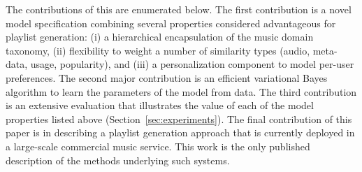 
The contributions of this are enumerated below. The first  contribution is a novel model specification combining several properties considered advantageous for playlist generation: (i) a hierarchical encapsulation of  the music domain taxonomy, (ii) flexibility to weight a number of similarity types (audio, meta-data, usage, popularity), and (iii) a personalization component to model per-user preferences. The second major contribution is an efficient  variational Bayes algorithm to learn the parameters of the model from data. The third contribution is an extensive evaluation that illustrates the value of each of the model properties listed above (Section~\ref{sec:experiments}). The final contribution of this paper is in describing a playlist generation approach that is currently deployed in a large-scale commercial music service. This work is the only published description of the methods underlying such systems. %
 



